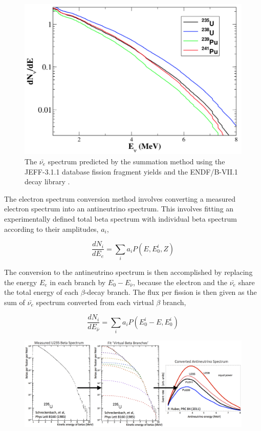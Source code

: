 \begin{figure}[t]
	\centering
	\includegraphics[width=0.7\linewidth]{tex/3-reactorneutrinos-images/Spectrum}
	\caption{The $\bar{\nu_e}$ spectrum predicted by the summation method using the JEFF-3.1.1 database fission fragment yields and the ENDF/B-VII.1 decay library \cite{HayesVogel}.}
	\label{fig:spectrum}
\end{figure}

The electron spectrum conversion method involves converting a measured electron spectrum into an antineutrino spectrum. 
This involves fitting an experimentally defined total beta spectrum with individual beta spectrum  according to their amplitudes, $a_i$, 

\begin{equation}
	\frac{dN_i}{dE_e} = \sum_{i}a_iP(E,E^i_0,Z)
\end{equation}

The conversion to the antineutrino spectrum is then accomplished by replacing the energy $E_e$ in each branch by $E_0 - E_{\bar{\nu}}$, because the electron and the $\bar{\nu_e}$ share the total energy of each $\beta$-decay branch.
The flux per fission is then given as the sum of $\bar{\nu_e}$ spectrum converted from each virtual $\beta$ branch,

\begin{equation}
	\frac{dN_i}{dE_{\bar{\nu}}} = \sum_{i}a_iP(E^i_0-E,E^i_0)
\end{equation}

\begin{figure}
	\centering
	\includegraphics[width=0.7\linewidth]{tex/3-reactorneutrinos-images/betaspecconversion_fixed}
	\caption{}
	\label{fig:betaspecconversionfixed}
\end{figure}




